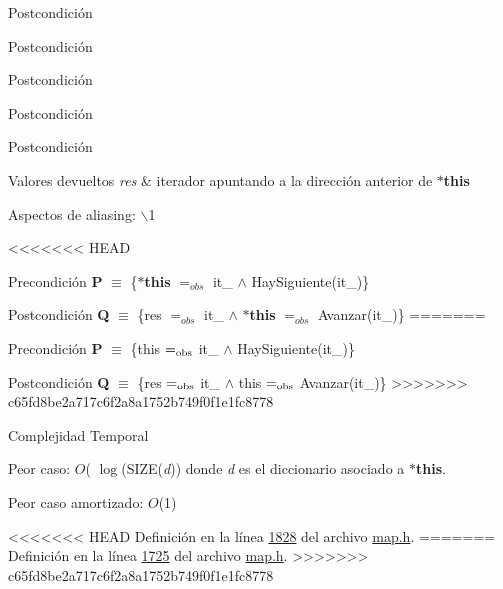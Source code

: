 \begin{Indent}
\begin{DoxyPostcond}{\-Postcondición}
\begin{DoxyPostcond}{\-Postcondición}
\begin{DoxyPostcond}{\-Postcondición}
\begin{DoxyPostcond}{\-Postcondición}
\begin{DoxyPostcond}{\-Postcondición}
\begin{DoxyRetVals}{\-Valores devueltos}
{\em res} & iterador apuntando a la dirección anterior de {\bfseries $\ast$this}\\
\hline
\end{DoxyRetVals}
\begin{DoxyParagraph}{\-Aspectos de aliasing\-:}
$\backslash$1
\end{DoxyParagraph}
<<<<<<< HEAD
\begin{DoxyPrecond}{\-Precondición}
{\bfseries \-P} $\equiv$ \{{\bfseries $\ast$this} $=_{obs}$ it\-\_ $\land$ \-Hay\-Siguiente(it\-\_)\} 
\end{DoxyPrecond}
\begin{DoxyPostcond}{\-Postcondición}
{\bfseries \-Q} $\equiv$ \{res $=_{obs}$ it\-\_ $\land$ {\bfseries $\ast$this} $=_{obs}$ \-Avanzar(it\-\_)\}
=======
\begin{DoxyPrecond}{Precondición}
{\bfseries P} $\equiv$ \{this $=_{\rm obs}$ it\+\_ $\land$ Hay\+Siguiente(it\+\_)\} 
\end{DoxyPrecond}
\begin{DoxyPostcond}{Postcondición}
{\bfseries Q} $\equiv$ \{res $=_{\rm obs}$ it\+\_ $\land$ this $=_{\rm obs}$ Avanzar(it\+\_)\}
>>>>>>> c65fd8be2a717c6f2a8a1752b749f0f1e1fc8778
\end{DoxyPostcond}

\begin{DoxyDescription}
\item[\-Complejidad \-Temporal]
\begin{DoxyItemize}
\item \-Peor caso\-: $O$( $\log$(\-S\-I\-Z\-E({\itshape d\/})) donde {\itshape d\/} es el diccionario asociado a {\bfseries $\ast$this}.
\item \-Peor caso amortizado\-: $O$(1) 
\end{DoxyItemize}
\end{DoxyDescription}

<<<<<<< HEAD
\-Definición en la línea \hyperlink{map_8h_source_l01828}{1828} del archivo \hyperlink{map_8h_source}{map.\-h}.
=======
Definición en la línea \hyperlink{map_8h_source_l01725}{1725} del archivo \hyperlink{map_8h_source}{map.\+h}.
>>>>>>> c65fd8be2a717c6f2a8a1752b749f0f1e1fc8778

\hypertarget{classaed2_1_1map_1_1iterator_ae7f70f71545d2a9de17b65edaaec748a_ae7f70f71545d2a9de17b65edaaec748a}{
}
\end{DoxyPostcond}
\end{DoxyPostcond}
\end{DoxyPostcond}
\end{DoxyPostcond}
\end{DoxyPostcond}
\end{DoxyPostcond}
\end{Indent}
